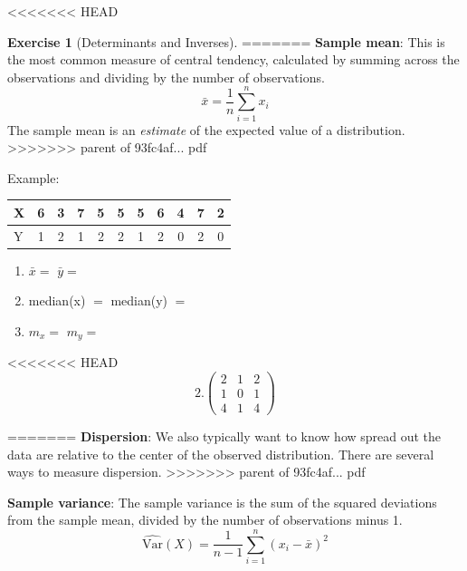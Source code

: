 \documentclass[]{book}
\theoremstyle{definition}
\theoremstyle{definition}
\theoremstyle{definition}
\newtheorem{exercise}{Exercise}[chapter]
\theoremstyle{remark}
\begin{document}
<<<<<<< HEAD
\begin{exercise}[Determinants and Inverses]
\protect\hypertarget{exr:determinants}{}{\label{exr:determinants} {} }
=======
\textbf{Sample mean}: This is the most common measure of central tendency, calculated by summing across the observations and dividing by the number of observations.
\[\bar{x} = \frac{1}{n}\sum_{i=1}^{n}x_i\]
The sample mean is an \emph{estimate} of the expected value of a distribution.
>>>>>>> parent of 93fc4af... pdf

\begin{framed}
Example:  
\begin{center}
\begin{tabular}{|l|cccccccccc|}
\hline
X & 6 & 3 & 7 & 5 & 5 & 5 & 6 & 4 & 7 & 2\\
\hline
Y & 1 & 2 & 1 & 2 & 2 & 1 & 2 & 0 & 2 & 0\\
\hline
\end{tabular}
\end{center}

\begin{enumerate}
\item $\bar{x} = $ \hspace{3.1cm} $\bar{y} = $
\item median(x) $ = $ \hspace{1.5cm} median(y) $ = $
\item $m_x = $ \hspace{2.75cm} $m_y =$\\
\end{enumerate}
\end{framed}

<<<<<<< HEAD
\[2. \begin{pmatrix}
            2 & 1 & 2\\
            1 & 0 & 1\\
            4 & 1 & 4
        \end{pmatrix}\]
\end{exercise}
=======
\textbf{Dispersion}: We also typically want to know how spread out the data are relative to the center of the observed distribution. There are several ways to measure dispersion.
>>>>>>> parent of 93fc4af... pdf

\textbf{Sample variance}: The sample variance is the sum of the squared deviations from the sample mean, divided by the number of observations minus 1.
\[ \hat{\text{Var}}(X) = \frac{1}{n-1}\sum_{i = 1}^n (x_i - \bar{x})^2\]
\end{document}
